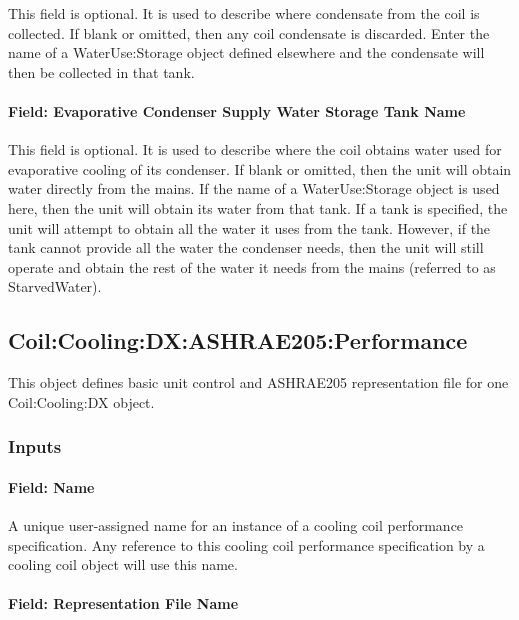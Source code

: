 This field is optional. It is used to describe where condensate from the coil is collected. If blank or omitted, then any coil condensate is discarded. Enter the name of a WaterUse:Storage object defined elsewhere and the condensate will then be collected in that tank.

\paragraph{Field: Evaporative Condenser Supply Water Storage Tank Name}\label{field-evaporative-condenser-supply-water-storage-tank-name-000}

This field is optional. It is used to describe where the coil obtains water used for evaporative cooling of its condenser. If blank or omitted, then the unit will obtain water directly from the mains. If the name of a WaterUse:Storage object is used here, then the unit will obtain its water from that tank. If a tank is specified, the unit will attempt to obtain all the water it uses from the tank. However, if the tank cannot provide all the water the condenser needs, then the unit will still operate and obtain the rest of the water it needs from the mains (referred to as StarvedWater).

\subsection{Coil:Cooling:DX:ASHRAE205:Performance}\label{coilcoolingdxashrae205performance}

This object defines basic unit control and ASHRAE205 representation file for one Coil:Cooling:DX object. 

\subsubsection{Inputs}

\paragraph{Field: Name}

A unique user-assigned name for an instance of a cooling coil performance specification. Any reference to this cooling coil performance specification by a cooling coil object will use this name.

\paragraph{Field: Representation File Name}

